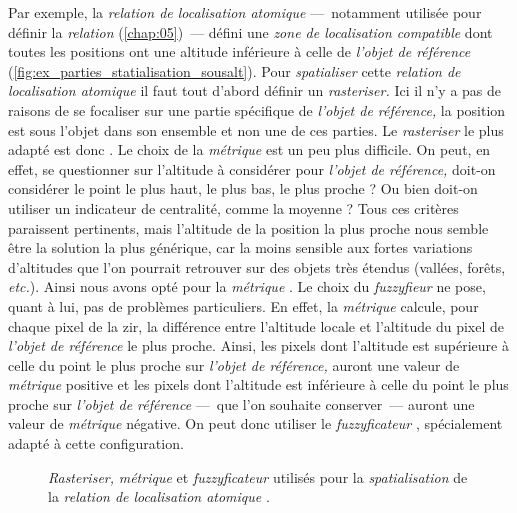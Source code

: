 %   

Par exemple, la \emph{relation de localisation atomique}
 ---~notamment utilisée pour définir
la \emph{relation} 
(\autoref{chap:05})~--- défini une \emph{zone de localisation
  compatible} dont toutes les positions ont une altitude inférieure à
celle de \emph{l'objet de référence}
(\autoref{fig:ex_parties_statialisation_sousalt}). Pour
\emph{spatialiser} cette \emph{relation de localisation atomique} il
faut tout d'abord définir un \emph{rasteriser.} Ici il n'y a pas de
raisons de se focaliser sur une partie spécifique de \emph{l'objet de
  référence,} la position est sous l'objet dans son ensemble et non
une de ces parties. Le \emph{rasteriser} le plus adapté est donc
. Le choix de la \emph{métrique} est un peu plus
difficile. On peut, en effet, se questionner sur l'altitude à
considérer pour \emph{l'objet de référence,} doit-on considérer le
point le plus haut, le plus bas, le plus proche ? Ou bien doit-on
utiliser un indicateur de centralité, comme la moyenne ? Tous ces
critères paraissent pertinents, mais l'altitude de la position la plus
proche nous semble être la solution la plus générique, car la moins
sensible aux fortes variations d'altitudes que l'on pourrait retrouver
sur des objets très étendus (\eg vallées, forêts, \emph{etc.}). Ainsi
nous avons opté pour la \emph{métrique}
. Le choix du \emph{fuzzyfieur} ne
pose, quant à lui, pas de problèmes particuliers. En effet, la
\emph{métrique}  calcule, pour chaque
pixel de la \ac{zir}, la différence entre l'altitude locale et
l'altitude du pixel de \emph{l'objet de référence} le plus
proche. Ainsi, les pixels dont l'altitude est supérieure à celle du
point le plus proche sur \emph{l'objet de référence,} auront une
valeur de \emph{métrique} positive et les pixels dont l'altitude est
inférieure à celle du point le plus proche sur \emph{l'objet de
  référence} ---~que l'on souhaite conserver~--- auront une valeur de
\emph{métrique} négative. On peut donc utiliser le
\emph{fuzzyficateur} , spécialement adapté à
cette configuration.

\begin{figure}
  \centering
  
  \caption{\emph{Rasteriser,} \emph{métrique} et \emph{fuzzyficateur}
    utilisés pour la \emph{spatialisation} de la \emph{relation de
      localisation atomique}
    \protect{}.}
  \label{fig:ex_parties_statialisation_sousalt}
\end{figure}

